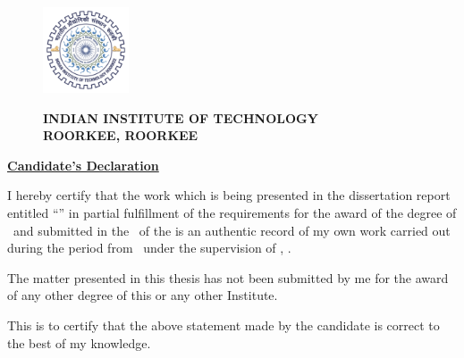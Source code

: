 \thispagestyle{empty}
\begin{figure}[htb]
	\begin{minipage}{0.12\textwidth}
	\includegraphics[width=1in, height=1in]{01.Cover/logo.pdf}
	\end{minipage}%
	\begin{minipage}[t]{0.88\textwidth}
	\begin{center}
		{
			\large
	 		\bfseries
	 		INDIAN INSTITUTE OF TECHNOLOGY\\
	 		ROORKEE, ROORKEE
		}
	\end{center}
	\end{minipage}
\end{figure}

\begin{center}
	\textbf{\underline{{Candidate's Declaration}}}
\end{center}


\vspace{0.5cm}
I hereby certify that the work which is being presented in the dissertation report entitled “\ttitle” in partial fulfillment of the requirements for the award of the degree of \degreename\ and submitted in the \deptname\ of the \univname is an authentic record of my own work carried out during the period from \workduration\ under the supervision of \supname, \suptitle{}.

\vspace{.05cm}

The matter presented in this thesis has not been submitted by
me for the award of any other degree of this or any other
Institute.
\vspace{1.5cm}

\begin{flushright}
	\bfseries  \authorname
\end{flushright}

This is to certify that the above statement made by the
candidate is correct to the best of my knowledge. \vspace{.3cm}
\vspace{2cm}

